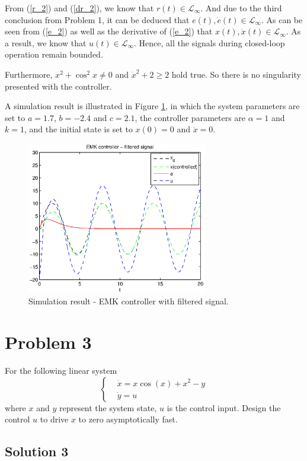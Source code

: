 \documentclass[12pt,a4paper]{article}
\begin{document}
\indent From (\ref{r_2}) and (\ref{dr_2}), we know that $r(t)\in{\mathcal L}_\infty$. And due to the third conclusion from Problem 1, it can be deduced that $e(t), \dot{e}(t)\in{\mathcal L}_\infty$. As can be seen from (\ref{e_2}) as well as the derivative of (\ref{e_2}) that $x(t), \dot{x}(t)\in{\mathcal L}_\infty$. As a result, we know that $u(t)\in{\mathcal L}_\infty$. Hence, all the signals during closed-loop operation remain bounded.

\indent Furthermore, $x^2+\cos^2x\ne 0$ and $\dot{x}^2+2\ge 2$ hold true. So there is no singularity presented with the controller.

\indent A simulation result is illustrated in Figure \ref{assign4_2}, in which the system parameters are set to $a=1.7$, $b=-2.4$ and $c=2.1$, the controller parameters are $\alpha=1$ and $k=1$, and the initial state is set to $x(0)=0$ and $\dot{x}=0$.
\begin{figure}
  \centering
  \includegraphics[width=0.7\textwidth]{figs/assign4_2.eps}%
  \caption{Simulation result - EMK controller with filtered signal.}
  \label{assign4_2}
\end{figure}

\section*{Problem 3}
For the following linear system
$$
\left\{
\begin{aligned}
&\dot{x}=x\cos(x)+x^2-y\\
&\dot{y}=u
\end{aligned}
\right.
$$
where $x$ and $y$ represent the system state, $u$ is the control input. Design the control $u$ to drive $x$ to zero asymptotically fast.

\subsection*{Solution 3}
\end{document}
